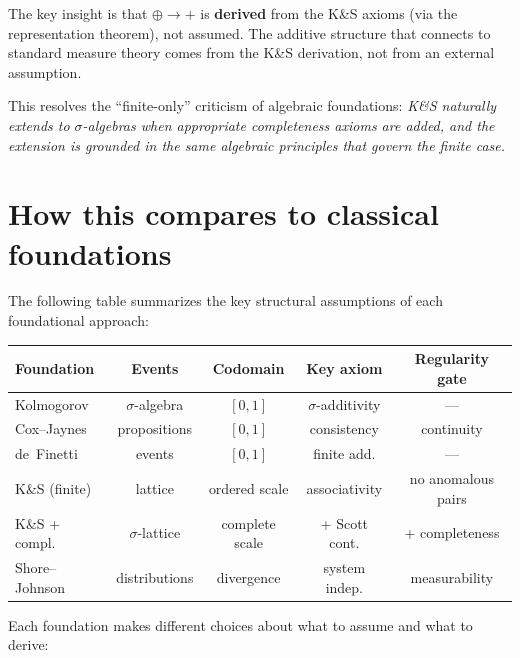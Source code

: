 \documentclass[11pt]{article}
\theoremstyle{definition}
\theoremstyle{remark}
\begin{document}
The key insight is that $\oplus \to +$ is \textbf{derived} from the K\&S axioms (via the representation
theorem), not assumed.  The additive structure that connects to standard measure theory comes from
the K\&S derivation, not from an external assumption.

This resolves the ``finite-only'' criticism of algebraic foundations: \emph{K\&S naturally extends to
$\sigma$-algebras when appropriate completeness axioms are added, and the extension is grounded
in the same algebraic principles that govern the finite case.}

\section{How this compares to classical foundations}

The following table summarizes the key structural assumptions of each foundational approach:

\begin{center}
\small
\begin{tabular}{|l|c|c|c|c|}
\hline
\textbf{Foundation} & \textbf{Events} & \textbf{Codomain} & \textbf{Key axiom} & \textbf{Regularity gate} \\
\hline
Kolmogorov & $\sigma$-algebra & $[0,1]$ & $\sigma$-additivity & --- \\
\hline
Cox--Jaynes & propositions & $[0,1]$ & consistency & continuity \\
\hline
de~Finetti & events & $[0,1]$ & finite add. & --- \\
\hline
K\&S (finite) & lattice & ordered scale & associativity & no anomalous pairs \\
\hline
K\&S + compl. & $\sigma$-lattice & complete scale & + Scott cont. & + completeness \\
\hline
Shore--Johnson & distributions & divergence & system indep. & measurability \\
\hline
\end{tabular}
\end{center}

Each foundation makes different choices about what to assume and what to derive:
\end{document}
